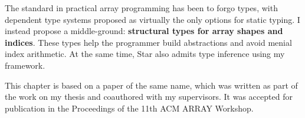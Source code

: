 The standard in practical array programming has been to forgo types, with dependent type systems proposed as virtually the only options for static typing. I instead propose a middle-ground: \textbf{structural types for array shapes and indices}. These types help the programmer build abstractions and avoid menial index arithmetic. At the same time, Star also admits type inference using my framework.

This chapter is based on a paper of the same name, which was written as part of the work on my thesis and coauthored with my supervisors. It was accepted for publication in the Proceedings of the 11th ACM ARRAY Workshop. 